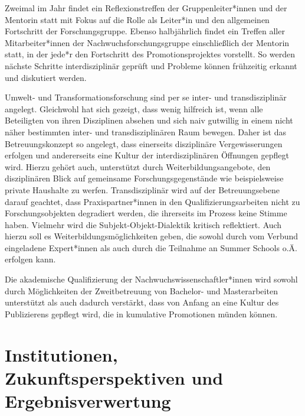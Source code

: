 \documentclass[a4paper,11pt,twoside]{scrartcl}
\begin{document}
Zweimal im Jahr findet ein Reflexionstreffen der Gruppenleiter*innen und der Mentorin statt mit Fokus auf die Rolle als Leiter*in und den allgemeinen Fortschritt der Forschungsgruppe. Ebenso halbjährlich findet ein Treffen aller Mitarbeiter*innen der Nachwuchsforschungsgruppe einschließlich der Mentorin statt, in der jede*r den Fortschritt des Promotionsprojektes vorstellt. So werden nächste Schritte interdisziplinär geprüft und Probleme können frühzeitig erkannt und diskutiert werden.

Umwelt- und Transformationsforschung sind per se inter- und transdisziplinär angelegt. Gleichwohl hat sich gezeigt, dass wenig hilfreich ist, wenn alle Beteiligten von ihren Disziplinen absehen und sich naiv gutwillig in einem nicht näher bestimmten inter- und transdisziplinären Raum bewegen. Daher ist das Betreuungskonzept so angelegt, dass einerseits disziplinäre Vergewisserungen %
erfolgen und andererseits eine Kultur der interdisziplinären Öffnungen gepflegt wird. Hierzu gehört auch, unterstützt durch Weiterbildungsangebote, den disziplinären Blick auf gemeinsame Forschungsgegenstände wie beispielsweise private Haushalte zu werfen. Transdisziplinär wird auf der Betreuungsebene darauf geachtet, dass Praxispartner*innen in den Qualifizierungsarbeiten nicht zu Forschungsobjekten degradiert werden, die ihrerseits im Prozess keine Stimme haben. Vielmehr wird die Subjekt-Objekt-Dialektik kritisch reflektiert. Auch hierzu soll es Weiterbildungsmöglichkeiten geben, die sowohl durch vom Verbund eingeladene Expert*innen als auch durch die Teilnahme an Summer Schools o.Ä. erfolgen kann. 

Die akademische Qualifizierung der Nachwuchswissenschaftler*innen wird sowohl durch Möglichkeiten der Zweitbetreuung von Bachelor- und Masterarbeiten unterstützt als auch dadurch verstärkt, dass von Anfang an eine Kultur des Publizierens gepflegt wird, die in kumulative Promotionen münden können.

\section{Institutionen, Zukunftsperspektiven und Ergebnisverwertung}
\end{document}

